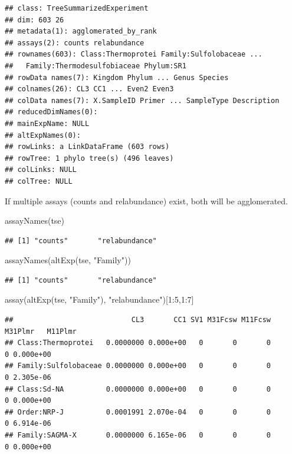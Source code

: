 \documentclass[
]{book}
\newenvironment{Shaded}{\begin{snugshade}}{\end{snugshade}}
\newcommand{\DecValTok}[1]{\textcolor[rgb]{0.00,0.00,0.81}{#1}}
\newcommand{\FunctionTok}[1]{\textcolor[rgb]{0.00,0.00,0.00}{#1}}
\newcommand{\NormalTok}[1]{#1}
\newcommand{\SpecialCharTok}[1]{\textcolor[rgb]{0.00,0.00,0.00}{#1}}
\newcommand{\StringTok}[1]{\textcolor[rgb]{0.31,0.60,0.02}{#1}}
\begin{document}
\begin{verbatim}
## class: TreeSummarizedExperiment 
## dim: 603 26 
## metadata(1): agglomerated_by_rank
## assays(2): counts relabundance
## rownames(603): Class:Thermoprotei Family:Sulfolobaceae ...
##   Family:Thermodesulfobiaceae Phylum:SR1
## rowData names(7): Kingdom Phylum ... Genus Species
## colnames(26): CL3 CC1 ... Even2 Even3
## colData names(7): X.SampleID Primer ... SampleType Description
## reducedDimNames(0):
## mainExpName: NULL
## altExpNames(0):
## rowLinks: a LinkDataFrame (603 rows)
## rowTree: 1 phylo tree(s) (496 leaves)
## colLinks: NULL
## colTree: NULL
\end{verbatim}

If multiple assays (counts and relabundance) exist, both will be agglomerated.

\begin{Shaded}
\begin{Highlighting}[]
\FunctionTok{assayNames}\NormalTok{(tse)}
\end{Highlighting}
\end{Shaded}

\begin{verbatim}
## [1] "counts"       "relabundance"
\end{verbatim}

\begin{Shaded}
\begin{Highlighting}[]
\FunctionTok{assayNames}\NormalTok{(}\FunctionTok{altExp}\NormalTok{(tse, }\StringTok{"Family"}\NormalTok{))}
\end{Highlighting}
\end{Shaded}

\begin{verbatim}
## [1] "counts"       "relabundance"
\end{verbatim}

\begin{Shaded}
\begin{Highlighting}[]
\FunctionTok{assay}\NormalTok{(}\FunctionTok{altExp}\NormalTok{(tse, }\StringTok{"Family"}\NormalTok{), }\StringTok{"relabundance"}\NormalTok{)[}\DecValTok{1}\SpecialCharTok{:}\DecValTok{5}\NormalTok{,}\DecValTok{1}\SpecialCharTok{:}\DecValTok{7}\NormalTok{]}
\end{Highlighting}
\end{Shaded}

\begin{verbatim}
##                            CL3       CC1 SV1 M31Fcsw M11Fcsw M31Plmr   M11Plmr
## Class:Thermoprotei   0.0000000 0.000e+00   0       0       0       0 0.000e+00
## Family:Sulfolobaceae 0.0000000 0.000e+00   0       0       0       0 2.305e-06
## Class:Sd-NA          0.0000000 0.000e+00   0       0       0       0 0.000e+00
## Order:NRP-J          0.0001991 2.070e-04   0       0       0       0 6.914e-06
## Family:SAGMA-X       0.0000000 6.165e-06   0       0       0       0 0.000e+00
\end{verbatim}
\end{document}
